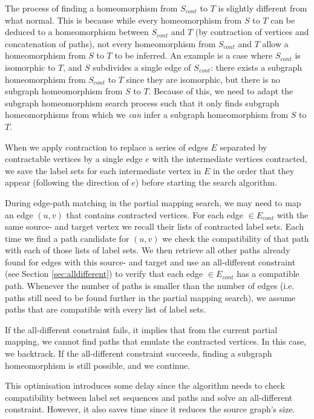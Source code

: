 The process of finding a homeomorphism from $S_{cont}$ to $T$ is slightly different from what normal. This is because while every homeomorphism from $S$ to $T$ can be deduced to a homeomorphism between $S_{cont}$ and $T$ (by contraction of vertices and concatenation of paths), not every homeomorphism from $S_{cont}$ and $T$ allow a homeomorphism from $S$ to $T$ to be inferred. An example is a case where $S_{cont}$ is isomorphic to $T$, and $S$ subdivides a single edge of $S_{cont}$: there exists a subgraph homeomorphism from $S_{cont}$ to $T$ since they are isomorphic, but there is no subgraph homeomorphism from $S$ to $T$. Because of this, we need to adapt the subgraph homeomorphism search process such that it only finds subgraph homeomorphisms from which we \textit{can} infer a subgraph homeomorphism from $S$ to $T$.

When we apply contraction to replace a series of edges $E$ separated by contractable vertices by a single edge $e$ with the intermediate vertices contracted, we save the label sets for each intermediate vertex in $E$ in the order that they appear (following the direction of $e$) before starting the search algorithm. 

During edge-path matching in the partial mapping search, we may need to map an edge $(u, v)$ that contains contracted vertices. For each edge $\in E_{cont}$ with the same source- and target vertex we recall their lists of contracted label sets. Each time we find a path candidate for $(u, v)$ we check the compatibility of that path with each of those lists of label sets. We then retrieve all other paths already found for edges with this source- and target and use an all-different constraint (see Section \ref{sec:alldifferent}) to verify that each edge $\in E_{cont}$ has a compatible path. Whenever the number of paths is smaller than the number of edges (i.e. paths still need to be found further in the partial mapping search), we assume paths that are compatible with every list of label sets.

If the all-different constraint fails, it implies that from the current partial mapping, we cannot find paths that emulate the contracted vertices. In this case, we backtrack. If the all-different constraint succeeds, finding a subgraph homeomorphism is still possible, and we continue.

This optimisation introduces some delay since the algorithm needs to check compatibility between label set sequences and paths and solve an all-different constraint. However, it also saves time since it reduces the source graph's size. 

